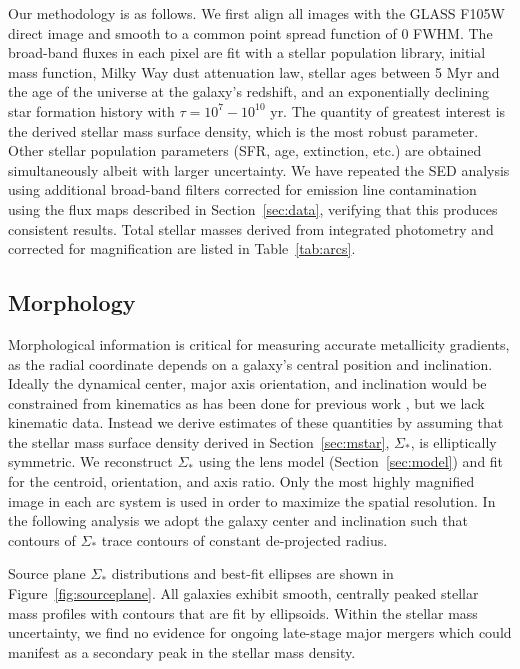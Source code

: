 Our methodology is as follows. We first align all images with the GLASS F105W direct image and smooth to a common
point spread function of 0 FWHM. The broad-band fluxes in each pixel are fit with a \citet{Bruzual2003}
stellar population library, \cite{Chabrier2003} initial mass function, Milky Way dust attenuation law, stellar
ages between 5 Myr and the age of the universe at the galaxy's redshift, and an exponentially declining star
formation history with $\tau = 10^{7}-10^{10}$ yr. The quantity of greatest interest is the derived stellar mass
surface density, which is the most robust parameter. Other stellar population parameters (SFR, age, extinction,
etc.) are obtained simultaneously albeit with larger uncertainty. We have repeated the SED analysis using
additional broad-band filters corrected for emission line contamination using the flux maps described in
Section~\ref{sec:data}, verifying that this produces consistent results. Total stellar masses derived from
integrated photometry and corrected for magnification are listed in Table~\ref{tab:arcs}.


\subsection{Morphology}\label{sec:morphology}

Morphological information is critical for measuring accurate metallicity gradients, as the radial coordinate
depends on a galaxy's central position and inclination. Ideally the dynamical center, major axis orientation, and
inclination would be constrained from kinematics as has been done for previous work \citep[e.g.,][]{Jones2013},
but we lack kinematic data. Instead we derive estimates of these quantities by assuming that the stellar mass
surface density derived in Section~\ref{sec:mstar}, $\Sigma_*$, is elliptically symmetric. We reconstruct
$\Sigma_*$ using the lens model (Section~\ref{sec:model}) and fit for the centroid, orientation, and axis ratio.
Only the most highly magnified image in each arc system is used in order to maximize the spatial resolution. In
the following analysis we adopt the galaxy center and inclination such that contours of $\Sigma_*$ trace contours
of constant de-projected radius.

Source plane $\Sigma_*$ distributions and best-fit ellipses are shown in Figure~\ref{fig:sourceplane}. All
galaxies exhibit smooth, centrally peaked stellar mass profiles with contours that are fit by ellipsoids. Within
the stellar mass uncertainty, we find no evidence for ongoing late-stage major mergers which could manifest as a
secondary peak in the stellar mass density.


